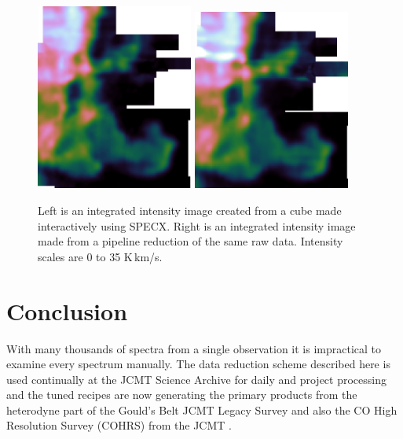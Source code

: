 \documentclass[final,authoryear,5p,times,twocolumn]{elsarticle}
\begin{document}
\begin{figure}
\begin{minipage}{\textwidth}
\centering
\includegraphics[width=0.46\textwidth]{horsehead-specx}
\includegraphics[width=0.46\textwidth]{horsehead-pipeline}
\caption{Left is an integrated intensity image created from
  a cube made interactively using SPECX. Right is an
  integrated intensity image made from a pipeline reduction of the
  same raw data. Intensity scales are 0 to 35 K\,km/s.}
\label{fig:hhcmp}
\end{minipage}
\end{figure}

\section{Conclusion}

With many thousands of spectra from a single observation it is
impractical to examine every spectrum manually. The data reduction
scheme described here is used continually at the JCMT Science Archive
\citep{2011ASPC..442..203E} for daily and project processing and the
tuned recipes are now generating the primary products from the
heterodyne part of the Gould's Belt JCMT Legacy Survey
\citep{2007PASP..119..855W} and also the CO High Resolution Survey
(COHRS) from the JCMT \citep{2013ApJS..209....8D}.
\end{document}
